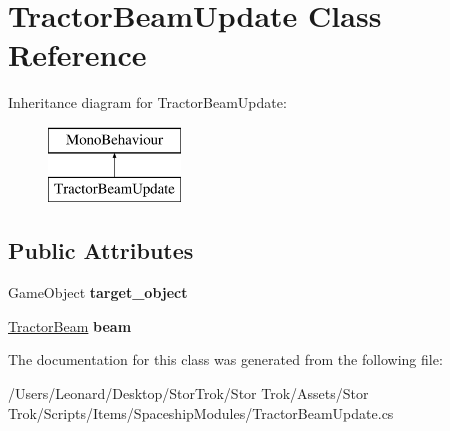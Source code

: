 \hypertarget{class_tractor_beam_update}{}\section{Tractor\+Beam\+Update Class Reference}
\label{class_tractor_beam_update}
Inheritance diagram for Tractor\+Beam\+Update\+:\begin{figure}[H]
\begin{center}
\leavevmode
\includegraphics[height=2.000000cm]{class_tractor_beam_update}
\end{center}
\end{figure}
\subsection*{Public Attributes}
\begin{DoxyCompactItemize}
\item 
\mbox{\label{class_tractor_beam_update_ab90b2c0d71d61c34de6eebee1d756b06}} 
Game\+Object {\bfseries target\+\_\+object}
\item 
\mbox{\label{class_tractor_beam_update_a96e4890d1f20b92a753776d3f822ee2d}} 
\hyperlink{class_tractor_beam}{Tractor\+Beam} {\bfseries beam}
\end{DoxyCompactItemize}


The documentation for this class was generated from the following file\+:\begin{DoxyCompactItemize}
\item 
/\+Users/\+Leonard/\+Desktop/\+Stor\+Trok/\+Stor Trok/\+Assets/\+Stor Trok/\+Scripts/\+Items/\+Spaceship\+Modules/Tractor\+Beam\+Update.\+cs\end{DoxyCompactItemize}
